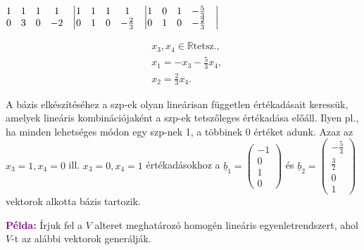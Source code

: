 \documentclass[../szamtud.tex]{subfiles}
\begin{document}
        \begin{minipage}{.44\linewidth}
            $\begin{matrix}
                1 & 1 & 1 & 1 & \bigm| \\
                0 & 3 & 0 & -2 & \bigm|
            \end{matrix}
            \begin{matrix}
                1 & 1 & 1 & 1 & \bigm| \\
                0 & 1 & 0 & -\frac{2}{3} & \bigm|
            \end{matrix}
            \begin{matrix}
                1 & 0 & 1 & -\frac{5}{3} & \bigm| \\
                0 & 1 & 0 & -\frac{2}{3} & \bigm|
            \end{matrix}$   
        \end{minipage}
        \begin{minipage}{.3\linewidth}
            \begin{align*}
                &x_3, x_4 \in \mathbb{R} \textrm{tetsz.,} \\
                &x_1 = -x_3 - \frac{5}{3}x_4, \\
                &x_2 = \frac{2}{3}x_4.
            \end{align*}
        \end{minipage}

        A bázis elkészítéséhez a szp-ek olyan lineárisan független értékadásait keressük, amelyek lineáris kombinációjaként a szp-ek tetszőleges értékadása előáll. Ilyen pl., ha minden lehetséges módon egy szp-nek 1, a többinek 0 értéket adunk. Azaz az $x_3 = 1, x_4 = 0$ ill. $x_3 = 0, x_4= 1$ értékadásokhoz a $\underline{b}_1 = \begin{pmatrix} -1 \\ 0 \\ 1 \\ 0 \end{pmatrix}$ és $\underline{b}_2 = \begin{pmatrix} -\frac{5}{3} \\ \frac{3}{2} \\ 0 \\ 1 \end{pmatrix}$ vektorok alkotta bázis tartozik.
        
        \textcolor{purple}{\textbf{Példa:}} Írjuk fel a $V$ alteret meghatározó homogén lineáris egyenletrendszert, ahol $V$-t az alábbi vektorok generálják. 
        
\end{document}
